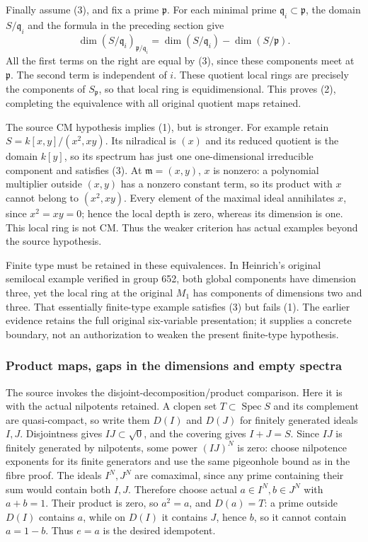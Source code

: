 Finally assume (3), and fix a prime \(\mathfrak p\). For each minimal prime \(\mathfrak q_i\subset\mathfrak p\), the domain \(S/\mathfrak q_i\) and the formula in the preceding section give \[
 \dim (S/\mathfrak q_i)_{\mathfrak p/\mathfrak q_i}
   =\dim(S/\mathfrak q_i)-\dim(S/\mathfrak p).
\] All the first terms on the right are equal by (3), since these components meet at \(\mathfrak p\). The second term is independent of \(i\). These quotient local rings are precisely the components of \(S_{\mathfrak p}\), so that local ring is equidimensional. This proves (2), completing the equivalence with all original quotient maps retained.

The source CM hypothesis implies (1), but is stronger. For example retain \(S=k[x,y]/(x^2,xy)\). Its nilradical is \((x)\) and its reduced quotient is the domain \(k[y]\), so its spectrum has just one one-dimensional irreducible component and satisfies (3). At \(\mathfrak m=(x,y)\), \(x\) is nonzero: a polynomial multiplier outside \((x,y)\) has a nonzero constant term, so its product with \(x\) cannot belong to \((x^2,xy)\). Every element of the maximal ideal annihilates \(x\), since \(x^2=xy=0\); hence the local depth is zero, whereas its dimension is one. This local ring is not CM. Thus the weaker criterion has actual examples beyond the source hypothesis.

Finite type must be retained in these equivalences. In Heinrich's original semilocal example verified in group 652, both global components have dimension three, yet the local ring at the original \(M_1\) has components of dimensions two and three. That essentially finite-type example satisfies (3) but fails (1). The earlier evidence retains the full original six-variable presentation; it supplies a concrete boundary, not an authorization to weaken the present finite-type hypothesis.

\subsubsection{Product maps, gaps in the dimensions and empty spectra}\label{algebra-proof-025-product-maps-gaps-in-the-dimensions-and-empty-spectra}

The source invokes the disjoint-decomposition/product comparison. Here it is with the actual nilpotents retained. A clopen set \(T\subset\operatorname{Spec}S\) and its complement are quasi-compact, so write them \(D(I)\) and \(D(J)\) for finitely generated ideals \(I,J\). Disjointness gives \(IJ\subset\sqrt0\), and the covering gives \(I+J=S\). Since \(IJ\) is finitely generated by nilpotents, some power \((IJ)^N\) is zero: choose nilpotence exponents for its finite generators and use the same pigeonhole bound as in the fibre proof. The ideals \(I^N,J^N\) are comaximal, since any prime containing their sum would contain both \(I,J\). Therefore choose actual \(a\in I^N,b\in J^N\) with \(a+b=1\). Their product is zero, so \(a^2=a\), and \(D(a)=T\): a prime outside \(D(I)\) contains \(a\), while on \(D(I)\) it contains \(J\), hence \(b\), so it cannot contain \(a=1-b\). Thus \(e=a\) is the desired idempotent.

